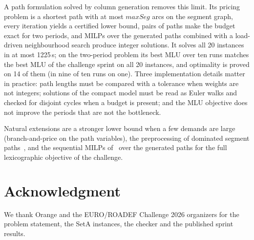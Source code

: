 \documentclass[conference]{IEEEtran}
\begin{document}
A path formulation solved by column generation removes this limit. Its pricing problem is a shortest path with at most $maxSeg$ arcs on the segment graph, every iteration yields a certified lower bound, pairs of paths make the budget exact for two periods, and MILPs over the generated paths combined with a load-driven neighbourhood search produce integer solutions. It solves all 20 instances in at most 1225\,s; on the two-period problem its best MLU over ten runs matches the best MLU of the challenge sprint on all 20 instances, and optimality is proved on 14 of them (in nine of ten runs on one). Three implementation details matter in practice: path lengths must be compared with a tolerance when weights are not integers; solutions of the compact model must be read as Euler walks and checked for disjoint cycles when a budget is present; and the MLU objective does not improve the periods that are not the bottleneck.

Natural extensions are a stronger lower bound when a few demands are large (branch-and-price on the path variables), the preprocessing of dominated segment paths~\cite{callebaut2023}, and the sequential MILPs of~\cite{benhamiche2026} over the generated paths for the full lexicographic objective of the challenge.

\section*{Acknowledgment}
We thank Orange and the EURO/ROADEF Challenge 2026 organizers for the problem statement, the SetA instances, the checker and the published sprint results.
\end{document}
